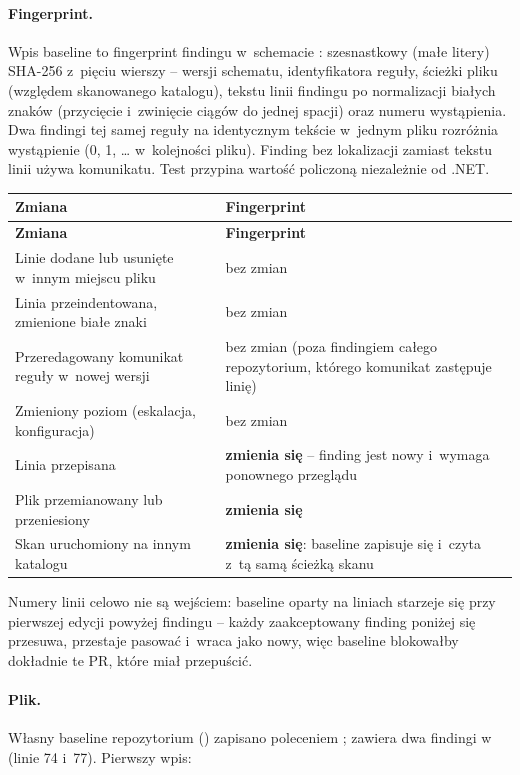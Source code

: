 \paragraph{Fingerprint.} Wpis baseline to fingerprint findingu w~schemacie
: szesnastkowy (małe litery) SHA-256 z~pięciu wierszy --
wersji schematu, identyfikatora reguły, ścieżki pliku (względem skanowanego katalogu),
tekstu linii findingu po normalizacji białych znaków (przycięcie i~zwinięcie ciągów do
jednej spacji) oraz numeru wystąpienia. Dwa findingi tej samej reguły na identycznym
tekście w~jednym pliku rozróżnia wystąpienie (0, 1, \ldots{} w~kolejności pliku). Finding
bez lokalizacji zamiast tekstu linii używa komunikatu. Test przypina wartość policzoną
niezależnie od .NET.

\begin{xltabular}{\linewidth}{@{}>{\raggedright\arraybackslash}X >{\raggedright\arraybackslash}p{6.4cm}@{}}
\toprule
\textbf{Zmiana} & \textbf{Fingerprint} \\
\midrule
\endfirsthead
\toprule
\textbf{Zmiana} & \textbf{Fingerprint} \\
\midrule
\endhead
Linie dodane lub usunięte w~innym miejscu pliku & bez zmian \\
Linia przeindentowana, zmienione białe znaki & bez zmian \\
Przeredagowany komunikat reguły w~nowej wersji & bez zmian (poza findingiem całego repozytorium, którego komunikat zastępuje linię) \\
Zmieniony poziom (eskalacja, konfiguracja) & bez zmian \\
Linia przepisana & \textbf{zmienia się} -- finding jest nowy i~wymaga ponownego przeglądu \\
Plik przemianowany lub przeniesiony & \textbf{zmienia się} \\
Skan uruchomiony na innym katalogu & \textbf{zmienia się}: baseline zapisuje się i~czyta z~tą samą ścieżką skanu \\
\bottomrule
\end{xltabular}

Numery linii celowo nie są wejściem: baseline oparty na liniach starzeje się przy pierwszej
edycji powyżej findingu -- każdy zaakceptowany finding poniżej się przesuwa, przestaje
pasować i~wraca jako nowy, więc baseline blokowałby dokładnie te PR, które miał przepuścić.

\paragraph{Plik.} Własny baseline repozytorium () zapisano
poleceniem ; zawiera dwa findingi 
w~ (linie 74 i~77). Pierwszy wpis:

